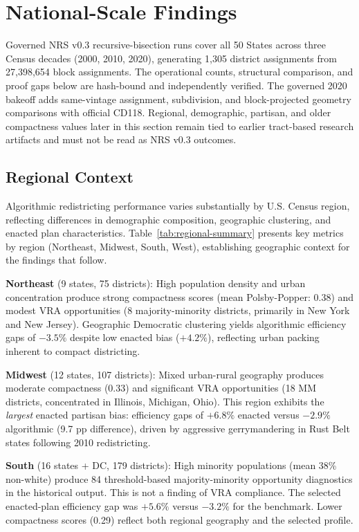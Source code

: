 \section{National-Scale Findings}

Governed NRS v0.3 recursive-bisection runs cover all 50 States across three
Census decades (2000, 2010, 2020), generating 1,305 district assignments from
27,398,654 block assignments. The operational counts, structural comparison,
and proof gaps below are hash-bound and independently verified. The governed
2020 bakeoff adds same-vintage assignment, subdivision, and block-projected
geometry comparisons with official CD118. Regional, demographic, partisan,
and older compactness values later in this section remain tied to earlier
tract-based research artifacts and must not be read as NRS v0.3 outcomes.

\subsection{Regional Context}

Algorithmic redistricting performance varies substantially by U.S. Census region, reflecting differences in demographic composition, geographic clustering, and enacted plan characteristics. Table~\ref{tab:regional-summary} presents key metrics by region (Northeast, Midwest, South, West), establishing geographic context for the findings that follow.



\textbf{Northeast} (9 states, 75 districts): High population density and urban concentration produce strong compactness scores (mean Polsby-Popper: 0.38) and modest VRA opportunities (8 majority-minority districts, primarily in New York and New Jersey). Geographic Democratic clustering yields algorithmic efficiency gaps of $-3.5\%$ despite low enacted bias ($+4.2\%$), reflecting urban packing inherent to compact districting.

\textbf{Midwest} (12 states, 107 districts): Mixed urban-rural geography produces moderate compactness (0.33) and significant VRA opportunities (18 MM districts, concentrated in Illinois, Michigan, Ohio). This region exhibits the \emph{largest} enacted partisan bias: efficiency gaps of $+6.8\%$ enacted versus $-2.9\%$ algorithmic (9.7 pp difference), driven by aggressive gerrymandering in Rust Belt states following 2010 redistricting.

\textbf{South} (16 states + DC, 179 districts): High minority populations
(mean 38\% non-white) produce 84 threshold-based majority-minority opportunity
diagnostics in the historical output. This is not a finding of VRA compliance.
The selected enacted-plan efficiency gap was $+5.6\%$ versus $-3.2\%$ for the
benchmark. Lower compactness scores (0.29) reflect both regional geography and
the selected profile.

